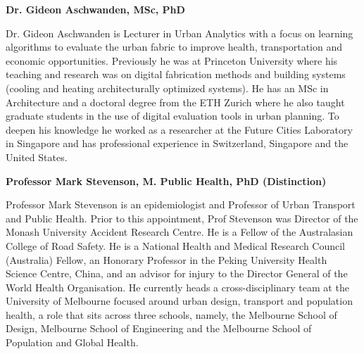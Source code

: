 \documentclass[Crown,sageh,times]{sagej}
\begin{document}
\begin{biogs}
\textbf{Dr. Gideon Aschwanden, MSc, PhD}

Dr. Gideon Aschwanden is Lecturer in Urban Analytics with a focus on learning algorithms to evaluate the urban fabric to improve health, transportation and economic opportunities. Previously he was at Princeton University where his teaching and research was on digital fabrication methods and building systems (cooling and heating architecturally optimized systems). He has an MSc in Architecture and a doctoral degree from the ETH Zurich where he also taught graduate students in the use of digital evaluation tools in urban planning. To deepen his knowledge he worked as a researcher at the Future Cities Laboratory in Singapore and has professional experience in Switzerland, Singapore and the United States.   

\textbf{Professor Mark Stevenson, M. Public Health, PhD (Distinction)}

Professor Mark Stevenson is an epidemiologist and Professor of Urban Transport and Public Health. Prior to this appointment, Prof Stevenson was Director of the Monash University Accident Research Centre. He is a Fellow of the Australasian College of Road Safety. He is a National Health and Medical Research Council (Australia) Fellow, an Honorary Professor in the Peking University Health Science Centre, China, and an advisor for injury to the Director General of the World Health Organisation. He currently heads a cross-disciplinary team at the University of Melbourne focused around urban design, transport and population health, a role that sits across three schools, namely, the Melbourne School of Design, Melbourne School of Engineering and the Melbourne School of Population and Global Health.

\end{biogs}
\end{document}
